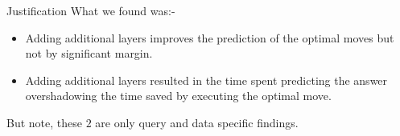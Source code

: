 \begin{frame}{Justification}
    What we found was:-
    \begin{itemize}[<+->]
        \item Adding additional layers improves the prediction of the optimal moves but not by significant margin.
        \item Adding additional layers resulted in the time spent predicting the answer overshadowing the time saved by executing the optimal move.
    \end{itemize}
But note, these $2$ are only query and data specific findings.
\end{frame}

